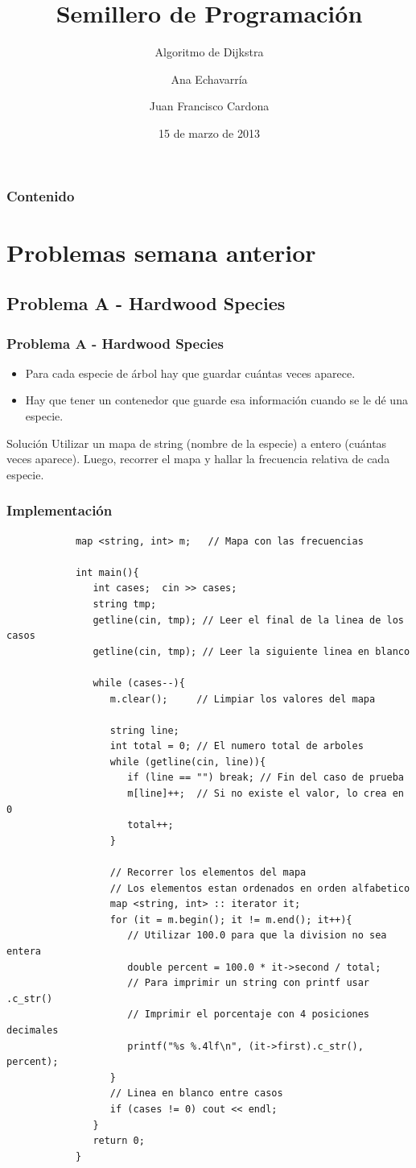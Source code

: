 \documentclass{beamer}
\title{Semillero de Programación}
\subtitle{Algoritmo de Dijkstra}
\author{Ana Echavarría \and Juan Francisco Cardona}
\institute{Universidad EAFIT}
\date{15 de marzo de 2013}
\begin{document}
\begin{frame}
	\titlepage
\end{frame}

\begin{frame}
	\frametitle{Contenido}
	\tableofcontents
\end{frame}

\section{Problemas semana anterior}
	\subsection{Problema A - Hardwood Species}
	\begin{frame}
		\frametitle{Problema A - Hardwood Species}
		\begin{itemize}
			\item Para cada especie de árbol hay que guardar cuántas veces aparece.
			\item Hay que tener un contenedor que guarde esa información cuando se le dé una especie.
		\end{itemize}
		\pause
		\begin{exampleblock}{Solución}
			Utilizar un mapa de string (nombre de la especie) a entero (cuántas veces aparece). Luego, recorrer el mapa y hallar la frecuencia relativa de cada especie.
		\end{exampleblock}
	\end{frame}
	
	\begin{frame}
		\frametitle{Implementación}
		\begin{lstlisting}
			map <string, int> m;   // Mapa con las frecuencias

			int main(){
			   int cases;  cin >> cases;
			   string tmp;
			   getline(cin, tmp); // Leer el final de la linea de los casos
			   getline(cin, tmp); // Leer la siguiente linea en blanco
			   
			   while (cases--){
			      m.clear();     // Limpiar los valores del mapa

			      string line;
			      int total = 0; // El numero total de arboles
			      while (getline(cin, line)){
			         if (line == "") break; // Fin del caso de prueba
			         m[line]++;  // Si no existe el valor, lo crea en 0
			         total++;  
			      }
			      
			      // Recorrer los elementos del mapa
			      // Los elementos estan ordenados en orden alfabetico
			      map <string, int> :: iterator it;
			      for (it = m.begin(); it != m.end(); it++){
			         // Utilizar 100.0 para que la division no sea entera
			         double percent = 100.0 * it->second / total;
			         // Para imprimir un string con printf usar .c_str()
			         // Imprimir el porcentaje con 4 posiciones decimales
			         printf("%s %.4lf\n", (it->first).c_str(), percent);
			      }
			      // Linea en blanco entre casos
			      if (cases != 0) cout << endl; 
			   }
			   return 0;
			}
		\end{lstlisting}
	\end{frame}
	
\end{document}
